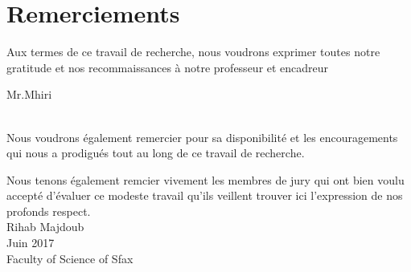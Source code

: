 \cleardoublepage
\section*{Remerciements}
\vspace{1.0in}
Aux termes de ce travail de recherche, nous voudrons exprimer toutes 
notre gratitude et nos recommaissances à notre professeur et encadreur
\\[0.2in]
\begin{center}
 Mr.Mhiri
\end{center}
\\[0.2in]
Nous voudrons également remercier pour sa disponibilité et les
encouragements qui nous a prodigués tout au long de ce travail
de recherche.

Nous tenons également remcier vivement les membres de jury qui 
ont bien voulu accepté d'évaluer ce modeste travail qu'ils 
veillent trouver ici l'expression de nos profonds respect.
\\[0.2in]

Rihab Majdoub \\[0.2in]
Juin 2017 \\
Faculty of Science of Sfax
